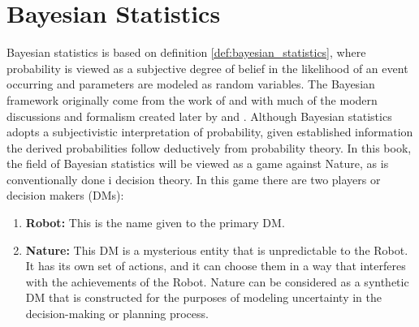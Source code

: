 \chapter{Bayesian Statistics}
\label{chp:bay}
Bayesian statistics is based on definition \ref{def:bayesian_statistics}, where probability is viewed as a subjective degree of belief in the likelihood of an event occurring and parameters are modeled as random variables. The Bayesian framework originally come from the work of \citet{Bayes:63} and \citet{laplace_thorie_1812} with much of the modern discussions and formalism created later by \citet{Finetti1937LaP,Jeffreys1940} and \citet{Savage1954}. Although Bayesian statistics adopts a subjectivistic interpretation of probability, given established information the derived probabilities follow deductively from probability theory. In this book, the field of Bayesian statistics will be viewed as a game against Nature, as is conventionally done i decision theory. In this game there are two players or decision makers (DMs):
	\begin{enumerate}
		\item \textbf{Robot:} This is the name given to the primary DM.
		
		\item \textbf{Nature:} This DM is a mysterious entity that is unpredictable to the Robot. It has its own set of actions, and it can choose them in a way that interferes with the achievements of the Robot. Nature can be considered as a synthetic DM that is constructed for the purposes of modeling uncertainty in the decision-making or planning process.
	\end{enumerate}
	
